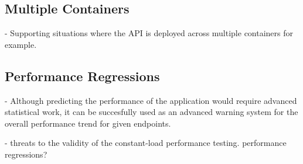 



  \subsection*{Multiple Containers}

  -   Supporting situations where the API is deployed across multiple containers for example.


  \subsection*{Performance Regressions}

    - Although predicting the performance of the application would require advanced statistical work, it can be succesfully used as an advanced warning system for the overall performance trend for given endpoints.

    - threats to the validity of the constant-load performance testing. performance regressions? 












